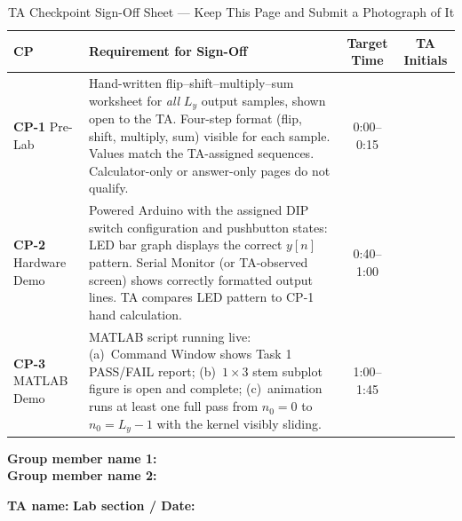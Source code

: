 \documentclass[11pt,letterpaper]{article}
\begin{document}
\begin{table}[H]
    \centering
    \caption{TA Checkpoint Sign-Off Sheet --- Keep This Page and Submit a Photograph of It}
    \label{tab:checkpoints}
    \begin{tabularx}{\linewidth}{l >{\raggedright\arraybackslash}X c c}
    \toprule
    \textbf{CP} & \textbf{Requirement for Sign-Off} & \textbf{Target Time} & \textbf{TA Initials}\\
    \midrule
    \textbf{CP-1}
        \newline Pre-Lab
        & Hand-written flip--shift--multiply--sum worksheet for \emph{all} $L_y$ output samples, shown open to the TA. Four-step format (flip, shift, multiply, sum) visible for each sample. Values match the TA-assigned sequences. Calculator-only or answer-only pages do not qualify.
        & 0:00--0:15
        & \underline{\hspace{2cm}}\\[0.6cm]
    \textbf{CP-2}
        \newline Hardware Demo
        & Powered Arduino with the assigned DIP switch configuration and pushbutton states: LED bar graph displays the correct $y[n]$ pattern. Serial Monitor (or TA-observed screen) shows correctly formatted output lines. TA compares LED pattern to CP-1 hand calculation.
        & 0:40--1:00
        & \underline{\hspace{2cm}}\\[0.6cm]
    \textbf{CP-3}
        \newline MATLAB Demo
        & MATLAB script running live: (a)~Command Window shows Task 1 PASS/FAIL report; (b)~$1\times3$ stem subplot figure is open and complete; (c)~animation runs at least one full pass from $n_0 = 0$ to $n_0 = L_y - 1$ with the kernel visibly sliding.
        & 1:00--1:45
        & \underline{\hspace{2cm}}\\
    \bottomrule
    \end{tabularx}
\end{table}

\medskip
\noindent\textbf{Group member name 1:} \underline{\hspace{5.2cm}}\\[0.15cm]
\noindent\textbf{Group member name 2:} \underline{\hspace{5.2cm}}

\noindent\textbf{TA name:} \underline{\hspace{5cm}} \quad \textbf{Lab section / Date:} \underline{\hspace{4cm}}
\end{document}
